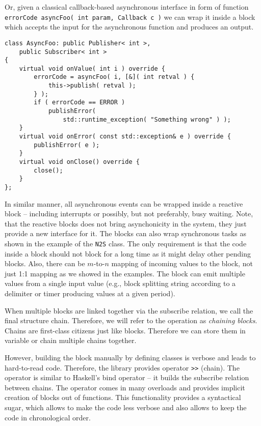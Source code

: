 Or, given a classical callback-based asynchronous interface in form of function
\texttt{errorCode asyncFoo( int param, Callback c )} we can
wrap it inside a block which accepts the input for the asynchronous function and
produces an output.
\begin{verbatim}
class AsyncFoo: public Publisher< int >,
    public Subscriber< int >
{
    virtual void onValue( int i ) override {
        errorCode = asyncFoo( i, [&]( int retval ) {
            this->publish( retval );
        } );
        if ( errorCode == ERROR )
            publishError(
                std::runtime_exception( "Something wrong" ) );
    }
    virtual void onError( const std::exception& e ) override {
        publishError( e );
    }
    virtual void onClose() override {
        close();
    }
};
\end{verbatim}

In similar manner, all asynchronous events can be wrapped inside a reactive
block -- including interrupts or possibly, but not preferably, busy waiting.
Note, that the reactive blocks does not bring asynchonicity in the system, they
just provide a new interface for it. The blocks can also wrap synchronous tasks
as shown in the example of the \texttt{N2S} class. The only requirement is that
the code inside a block should not block for a long time as it might delay other
pending blocks. Also, there can be $m$-to-$n$ mapping of incoming values to the
block, not just 1:1 mapping as we showed in the examples. The block can emit
multiple values from a single input value (e.g., block splitting string
according to a delimiter or timer producing values at a given period).

When multiple blocks are linked together via the subscribe relation, we call the
final structure chain. Therefore, we will refer to the operation as
\emph{chaining blocks}. Chains are first-class citizens just like blocks.
Therefore we can store them in variable or chain multiple chains together.

However, building the block manually by defining classes is verbose and leads to
hard-to-read code. Therefore, the library provides operator
\texttt{>>} (chain). The operator is similar to Haskell's
bind operator -- it builds the subscribe relation between chains. The operator
comes in many overloads and provides implicit creation of blocks out of
functions. This functionality provides a syntactical sugar, which allows to make
the code less verbose and also allows to keep the code in chronological order.

